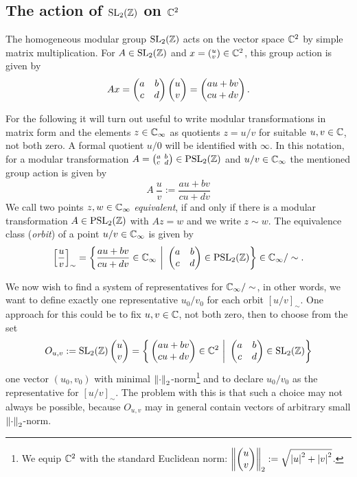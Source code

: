 \subsection{The action of $\SL{\Z}$ on $\C^2$}

The homogeneous modular group $\SL{\Z}$ acts on the vector space $\C^2$ by simple matrix multiplication. For $A \in \SL{\Z}$ and $x = ({}^u_v) \in \C^2$, this group action is given by
\begin{equation*}
A x = \mat{a}{b}{c}{d} \cvec{u}{v} = \cvec{a u + b v}{c u + d v}.
\end{equation*}

For the following it will turn out useful to write modular transformations in matrix form and the elements $z \in \EC$ as quotients $z = u/v$ for suitable $u,v \in \C$, not both zero. A formal quotient $u/0$ will be identified with $\infty$. In this notation, for a modular transformation $A = \smallmat{a}{b}{c}{d} \in \PSL{\Z}$ and $u/v \in \EC$ the mentioned group action is given by
\begin{equation}
\label{eqn_ModGrpAction}
A \ \frac{u}{v} := \frac{a u + b v}{c u + d v}
\end{equation}
We call two points $z, w \in \EC$ \emph{equivalent}, if and only if there is a modular transformation $A \in \PSL{\Z}$ with $A z = w$ and we write  $z \sim w$. The equivalence class (\emph{orbit}) of a point $u/v \in \EC$ is given by 
\begin{equation*}
\left[\frac{u}{v}\right]_\sim = 
\setdefsz{\bigg}{\frac{a u + b v}{c u + d v} \in \EC}{\mat{a}{b}{c}{d} \in \PSL{\Z}} \in \EC / \sim.
\end{equation*}

We now wish to find a system of representatives for $\EC/\sim$, in other words, we want to define exactly one representative $u_0/v_0$ for each orbit $[u/v]_\sim$. One approach for this could be to fix $u,v \in \C$, not both zero, then to choose from the set
\begin{equation}
\label{eqn_FunDomOuv}
O_{u,v} := \SL{\Z} \cvec{u}{v} = \setdefsz{\bigg}{\cvec{a u + b v}{c u + d v} \in \C^2}{\mat{a}{b}{c}{d} \in \SL{\Z}}
\end{equation}
one vector $(u_0, v_0)$ with minimal $\eucnorm{\cdot}$-norm\footnote{We equip $\C^2$ with the standard Euclidean norm: $\eucnorm{\cvec{u}{v}} := \sqrt{\abs{u}^2 + \abs{v}^2}$.} and to declare $u_0/v_0$ as the representative for $[u/v]_\sim$. The problem with this is that such a choice may not always be possible, because $O_{u,v}$ may in general contain vectors of arbitrary small $\eucnorm{\cdot}$-norm. 

